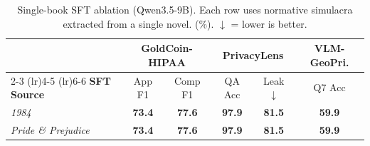 \begin{table}[t]
\centering
\caption{Single-book SFT ablation (Qwen3.5-9B). Each row uses normative simulacra extracted from a single novel. (\%). $\downarrow$ = lower is better.}
\label{tab:single-book-ablation}
\begin{tabular}{lccccc}
\toprule
  & \multicolumn{2}{c}{\textbf{GoldCoin-HIPAA}} & \multicolumn{2}{c}{\textbf{PrivacyLens}} & \multicolumn{1}{c}{\textbf{VLM-GeoPri.}} \\
\cmidrule(lr){2-3} \cmidrule(lr){4-5} \cmidrule(lr){6-6}
\textbf{SFT Source} & App F1 & Comp F1 & QA Acc & Leak $\downarrow$ & Q7 Acc \\
\midrule
\textit{1984} & \textbf{73.4} & \textbf{77.6} & \textbf{97.9} & \textbf{81.5} & \textbf{59.9} \\
\textit{Pride \& Prejudice} & \textbf{73.4} & \textbf{77.6} & \textbf{97.9} & \textbf{81.5} & \textbf{59.9} \\
\bottomrule
\end{tabular}
\end{table}